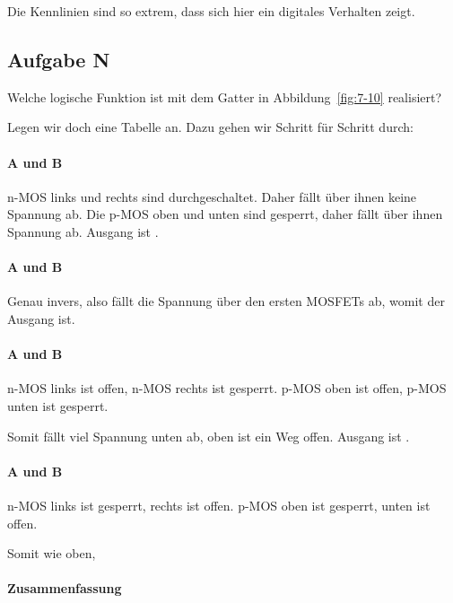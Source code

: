 Die Kennlinien sind so extrem, dass sich hier ein digitales Verhalten zeigt.

\subsection{Aufgabe N}

\begin{problem}
	Welche logische Funktion ist mit dem Gatter in Abbildung~\ref{fig:7-10}
	realisiert?
\end{problem}

Legen wir doch eine Tabelle an. Dazu gehen wir Schritt für Schritt durch:

\paragraph{A und B \tlow}

n-MOS links und rechts sind durchgeschaltet. Daher fällt über ihnen keine
Spannung ab. Die p-MOS oben und unten sind gesperrt, daher fällt über ihnen
Spannung ab. Ausgang ist \thigh.

\paragraph{A und B \thigh}

Genau invers, also fällt die Spannung über den ersten MOSFETs ab, womit der
Ausgang \tlow ist.

\paragraph{A \thigh{} und B \tlow}

n-MOS links ist offen, n-MOS rechts ist gesperrt. p-MOS oben ist offen, p-MOS
unten ist gesperrt.

Somit fällt viel Spannung unten ab, oben ist ein Weg offen. Ausgang ist \thigh.

\paragraph{A \tlow{} und B \thigh}

n-MOS links ist gesperrt, rechts ist offen. p-MOS oben ist gesperrt, unten ist
offen.

Somit wie oben, \thigh

\paragraph{Zusammenfassung}

